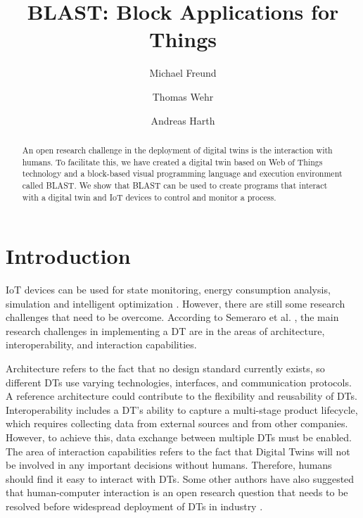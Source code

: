 \documentclass[runningheads]{llncs}
\begin{document}
%
\title{BLAST: Block Applications for Things}
%
%
\author{Michael Freund \and
Thomas Wehr \and
Andreas Harth}
%
%
%
\maketitle              %
%
\begin{abstract}
  An open research challenge in the deployment of digital twins is the interaction with humans.
  To facilitate this, we have created a digital twin based on Web of Things technology and a block-based visual programming language and execution environment called BLAST.
  We show that BLAST can be used to create programs that interact with a digital twin and IoT devices to control and monitor a process.

\end{abstract}
%
%
%
\setcounter{footnote}{0}
\section{Introduction}
IoT devices can be used for state monitoring, energy consumption analysis, simulation and intelligent optimization \cite{CIMINO2019103130}.
However, there are still some research challenges that need to be overcome.
According to Semeraro et al. \cite{SEMERARO2021103469}, the main research challenges in implementing a DT are in the areas of architecture, interoperability, and  interaction capabilities.

Architecture refers to the fact that no design standard currently exists, so different DTs use varying technologies, interfaces, and communication protocols.
A reference architecture could contribute to the flexibility and reusability of DTs.
Interoperability includes a DT's ability to capture a multi-stage product lifecycle, which requires collecting data from external sources and from other companies.
However, to achieve this, data exchange between multiple DTs must be enabled.
The area of interaction capabilities refers to the fact that Digital Twins will not be involved in any important decisions without humans. Therefore, humans should find it easy to interact with DTs. 
Some other authors have also suggested that human-computer interaction is an open research question that needs to be resolved before widespread deployment of DTs in industry \cite{KUEHNER20211227}.
\end{document}
